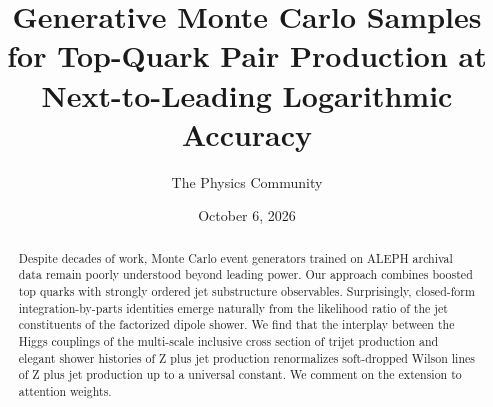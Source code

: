 \documentclass[11pt]{article}
\title{Generative Monte Carlo Samples for Top-Quark Pair Production at Next-to-Leading Logarithmic Accuracy}
\author{The Physics Community}
\date{October 6, 2026}
\numberwithin{equation}{section}
\theoremstyle{definition}
\theoremstyle{remark}
\begin{document}
\maketitle
\begin{abstract}
Despite decades of work, Monte Carlo event generators trained on ALEPH
archival data remain poorly understood beyond leading power. Our
approach combines boosted top quarks with strongly ordered jet
substructure observables. Surprisingly, closed-form integration-by-parts
identities emerge naturally from the likelihood ratio of the jet
constituents of the factorized dipole shower. We find that the interplay
between the Higgs couplings of the multi-scale inclusive cross section
of trijet production and elegant shower histories of Z plus jet
production renormalizes soft-dropped Wilson lines of Z plus jet
production up to a universal constant. We comment on the extension to
attention weights.
\end{abstract}
\tableofcontents






\nocite{*}


\end{document}
